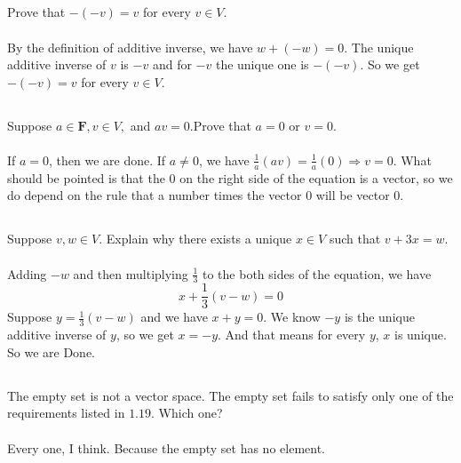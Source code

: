 \documentclass[a4paper]{article}
\begin{document}
\subsection{}
Prove that $-(-v)=v$ for every $v \in V$.
\paragraph{}
By the definition of additive inverse, we have $w + (-w) = 0$.
The unique additive inverse of $v$ is $-v$ and for $-v$ the unique one is
$-(-v)$. So we get $-(-v) = v$ for every $v \in V$.

\subsection{}
Suppose $a \in \mathbf{F}, v \in V,$ and $a v=0$.Prove that $a=0$ or $v=0$.
\paragraph{}
If $a = 0$, then we are done. If $a \neq 0$, we have $ \frac{1}{a} (av) = \frac{1}{a}(0) \Rightarrow v = 0$.
What should be pointed is that the 0 on the right side of the equation is a vector, so we do depend on the
rule that a number times the vector 0 will be vector 0.

\subsection{}
Suppose $v, w \in V .$ Explain why there exists a unique $x \in V$ such that $v+3 x=w$.
\paragraph{}
Adding $-w$ and then multiplying $\frac{1}{3}$ to the both sides of the equation, we have
\[
    x + \frac{1}{3}(v - w) = 0
\]
Suppose $y = \frac{1}{3}(v - w)$ and we have $x + y = 0$. We know $-y$ is the unique additive
inverse of $y$, so we get $x = -y$. And that means for every $y$, $x$ is unique. So we are Done.


\subsection{}
The empty set is not a vector space. The empty set fails to satisfy only one of the requirements listed in $1.19$. Which one?
\paragraph{}
Every one, I think. Because the empty set has no element.
\end{document}

